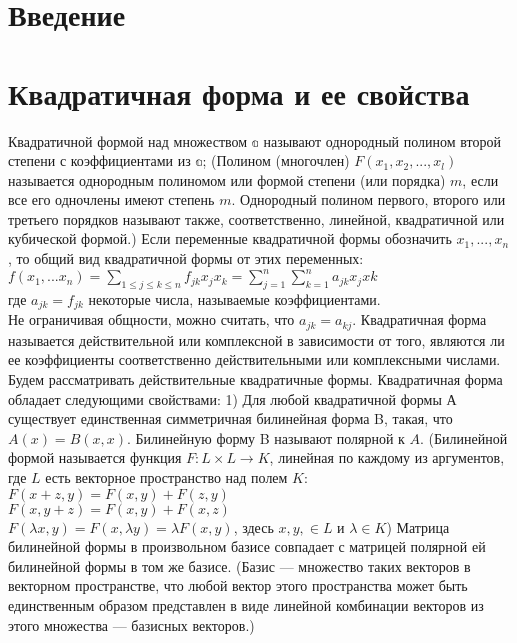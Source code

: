 \documentclass[a4paper,14pt]{report}
\author{Sharov Alex}
\newcommand\tab[1][1cm]{\hspace*{#1}}
\newcommand{\udsum}[3]{\sum\limits_{#1}^{#2}{#3}}
\newcommand{\dsum}[2]{\sum\limits_{#1}{#2}}
\newcommand{\tl}{\newline\tab}
\begin{document}

\setcounter{tocdepth}{1}

\tableofcontents

\section{Введение}

\section{Квадратичная форма и ее свойства}

\tab Квадратичной формой над множеством $\mathds{a}$ называют однородный полином второй степени с коэффициентами из $\mathds{a}$;
\tl
(Полином (многочлен) $F(x_1,x_2,...,x_l)$ называется однородным полиномом или формой степени (или порядка) $m$, если все его одночлены имеют степень $m$. Однородный полином первого, второго или третьего порядков называют также, соответственно, линейной, квадратичной или кубической формой.)
\tl
Если переменные квадратичной формы обозначить $x_1,...,x_n$, то общий вид квадратичной формы от этих переменных:
\\
$f(x_1,...x_n)=\dsum{1 \le j \le k \le n}{f_{jk}x_jx_k} = \udsum{j=1}{n}{}\udsum{k=1}{n}{a_{jk}x_{j}x{k}}$
\\ \tab где $a_{jk} = f_{jk}$ некоторые числа, называемые коэффициентами.
\\
Не ограничивая общности, можно считать, что $a_{jk} = a_{kj}$. Квадратичная форма называется действительной или комплексной в зависимости от того, являются ли ее коэффициенты соответственно действительными или комплексными числами. Будем рассматривать действительные квадратичные формы.
\tl 
Квадратичная форма обладает следующими свойствами:
\tl
1) Для любой квадратичной формы $А$ существует единственная симметричная билинейная форма B, такая, что $A(x) = B(x, x)$. Билинейную форму B называют полярной к $A$. 
\tl
(Билинейной формой называется функция $F:L \times L \to K$, линейная по каждому из аргументов, где $L$ есть векторное пространство над полем $K$: \\
\tab $F(x+z,y)=F(x,y)+F(z,y)$ \\
\tab $F(x,y+z)=F(x,y)+F(x,z)$ \\
\tab $F(\lambda x,y)= F(x,\lambda y) = \lambda F(x,y)$, здесь $x,y,\in L$ и $\lambda \in K$)
\tl
Матрица билинейной формы в произвольном базисе совпадает с матрицей полярной ей билинейной формы в том же базисе.
\tl
(Базис — множество таких векторов в векторном пространстве, что любой вектор этого пространства может быть единственным образом представлен в виде линейной комбинации векторов из этого множества — базисных векторов.)
\end{document}
